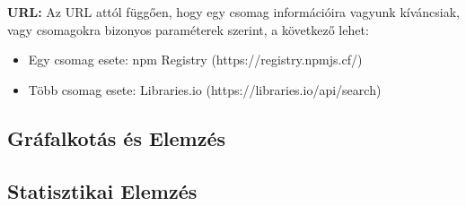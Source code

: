 \textbf{URL:} Az URL attól függően, hogy egy csomag információira vagyunk kíváncsiak, vagy csomagokra bizonyos paraméterek szerint, a következő lehet:
\begin{itemize}
	\item Egy csomag esete: npm Registry (https://registry.npmjs.cf/)
	\item Több csomag esete: Libraries.io (https://libraries.io/api/search)
\end{itemize} 

\subsection{Gráfalkotás és Elemzés}

\subsection{Statisztikai Elemzés}
